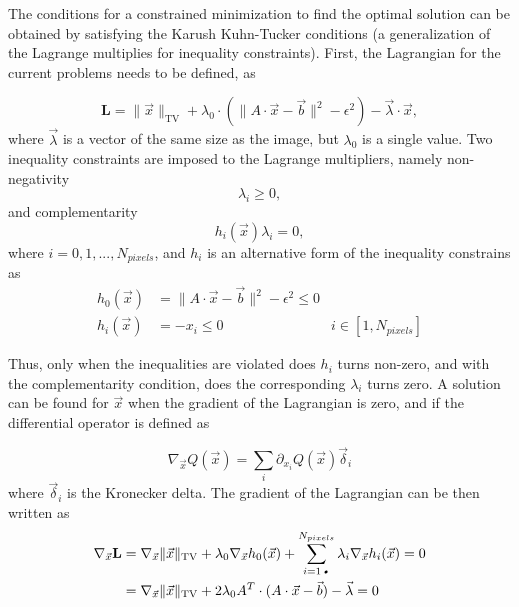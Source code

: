 The conditions for a constrained minimization to find the optimal solution can be obtained by satisfying the Karush Kuhn-Tucker conditions (a generalization of the Lagrange multiplies for inequality constraints). First, the Lagrangian for the current problems needs to be defined, as

\begin{equation}
\textbf{L}=\lVert \vec{x} \rVert_\text{TV}+\lambda_0\cdot(\lVert A\cdot \vec{x}-\vec{b}\rVert^2 - \epsilon^2)-\vec{\lambda}\cdot\vec{x},\label{eq:Lagrangian}
\end{equation}
where $\vec{\lambda}$ is a vector of the same size as the image, but $\lambda_0$ is a single value. Two inequality constraints are imposed to the Lagrange multipliers, namely non-negativity
\begin{equation}
\lambda_i \geq 0,
\end{equation}
and complementarity 
\begin{equation}
h_i(\vec{x}) \lambda_i = 0,
\end{equation}
where $i=0,1,..., N_{pixels}$, and $h_i$ is an alternative form of the inequality constrains as
\begin{align}
h_0(\vec{x}) &=\lVert A\cdot \vec{x}-\vec{b}\rVert^2 - \epsilon^2 \leq 0&\\
h_i(\vec{x}) &= -x_i \leq 0 & i \in [1, N_{pixels}]
\end{align}

Thus, only when the inequalities are violated does $h_i$ turns non-zero, and with the complementarity condition, does the corresponding $\lambda_i$ turns zero. A solution can be found for $\vec{x}$ when the gradient of the Lagrangian is zero, and if the differential operator is defined as

\begin{equation}
\nabla_{\vec{x}}Q(\vec{x})=\sum_i {\partial_{x_i}}Q(\vec{x}) \vec{\delta}_i
\end{equation}
where $\vec{\delta}_i$ is the Kronecker delta. The gradient of the Lagrangian can be then written as
\begin{align}
\nabla_{\vec{x}}\textbf{L}&=\nabla_{\vec{x}}\lVert \vec{x} \rVert_\text{TV}+\lambda_0\nabla_{\vec{x}}h_0(\vec{x})+\sum_{i=1\textit{•}}^{N_{pixels}}\lambda_i\nabla_{\vec{x}}h_i(\vec{x})=0 \notag \\
&=\nabla_{\vec{x}}\lVert \vec{x} \rVert_\text{TV}+2\lambda_0 A^T\cdot(A\cdot\vec{x}-\vec{b})-\vec{\lambda}=0 \label{eq:KKT}
\end{align}

